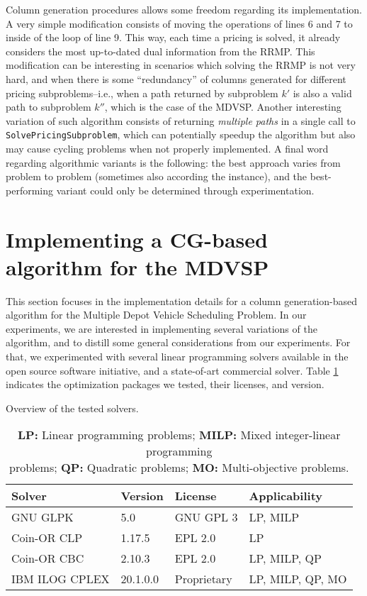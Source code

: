 \documentclass{article}
\begin{document}
Column generation procedures allows some freedom regarding its implementation. A very simple modification consists of moving the operations of lines 6 and 7 to inside of the loop of line 9. This way, each time a pricing is solved, it already considers the most up-to-dated dual information from the RRMP. This modification can be interesting in scenarios which solving the RRMP is not very hard, and when there is some ``redundancy'' of columns generated for different pricing subproblems--i.e., when a path returned by subproblem $k'$ is also a valid path to subproblem $k''$, which is the case of the MDVSP. Another interesting variation of such algorithm consists of returning \textit{multiple paths} in a single call to \texttt{SolvePricingSubproblem}, which can potentially speedup the algorithm but also may cause cycling problems when not properly implemented. A final word regarding algorithmic variants is the following: the best approach varies from problem to problem (sometimes also according the instance), and the best-performing variant could only be determined through experimentation.

\section{Implementing a CG-based algorithm for the MDVSP}

This section focuses in the implementation details for a column generation-based algorithm for the Multiple Depot Vehicle Scheduling Problem. In our experiments, we are interested in implementing several variations of the algorithm, and to distill some general considerations from our experiments. For that, we experimented with several linear programming solvers available in the open source software initiative, and a state-of-art commercial solver. Table \ref{table:solvers} indicates the optimization packages we tested, their licenses, and version.

\begin{table}[!htb]
   \centering
   \caption{Overview of the tested solvers.}
   \label{table:solvers}
   \begin{tabular}{llll}
      \toprule
      Solver & Version & License & Applicability\\
      \midrule
      GNU GLPK & 5.0 & GNU GPL 3 & LP, MILP\\
      Coin-OR CLP & 1.17.5 & EPL 2.0 & LP\\
      Coin-OR CBC & 2.10.3 & EPL 2.0 & LP, MILP, QP\\
      IBM ILOG CPLEX & 20.1.0.0 & Proprietary & LP, MILP, QP, MO\\
      \bottomrule
   \end{tabular}
   \captionsetup{format = hang, width=0.9\textwidth, justification=centering}
   \caption*{
      \footnotesize
      \textbf{LP:} Linear programming problems; \textbf{MILP:} Mixed integer-linear programming \\ problems; \textbf{QP:} Quadratic problems; \textbf{MO:} Multi-objective problems.
   }
\end{table}
\end{document}
